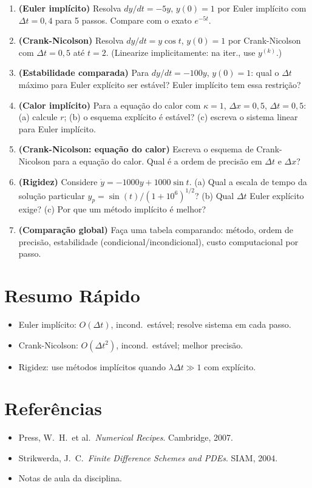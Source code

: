 \documentclass[12pt,a4paper]{article}
\begin{document}
\begin{enumerate}
  \item \textbf{(Euler impl\'icito)} Resolva $dy/dt = -5y$, $y(0)=1$ por Euler impl\'icito com $\Delta t=0{,}4$ para 5 passos. Compare com o exato $e^{-5t}$.
  
  \item \textbf{(Crank-Nicolson)} Resolva $dy/dt = y\cos t$, $y(0)=1$ por Crank-Nicolson com $\Delta t=0{,}5$ at\'e $t=2$. (Linearize implicitamente: na iter., use $y^{(k)}$.)
  
  \item \textbf{(Estabilidade comparada)} Para $dy/dt = -100y$, $y(0)=1$: qual o $\Delta t$ m\'aximo para Euler expl\'icito ser est\'avel? Euler impl\'icito tem essa restri\c{c}\~ao?
  
  \item \textbf{(Calor impl\'icito)} Para a equa\c{c}\~ao do calor com $\kappa=1$, $\Delta x=0{,}5$, $\Delta t=0{,}5$: (a) calcule $r$; (b) o esquema expl\'icito \'e est\'avel? (c) escreva o sistema linear para Euler impl\'icito.
  
  \item \textbf{(Crank-Nicolson: equa\c{c}\~ao do calor)} Escreva o esquema de Crank-Nicolson para a equa\c{c}\~ao do calor. Qual \'e a ordem de precis\~ao em $\Delta t$ e $\Delta x$?
  
  \item \textbf{(Rigidez)} Considere $\dot y = -1000y + 1000\sin t$. (a) Qual a escala de tempo da solu\c{c}\~ao particular $y_p = \sin(t)/(1+10^6)^{1/2}$? (b) Qual $\Delta t$ Euler expl\'icito exige? (c) Por que um m\'etodo impl\'icito \'e melhor?
  
  \item \textbf{(Compara\c{c}\~ao global)} Fa\c{c}a uma tabela comparando: m\'etodo, ordem de precis\~ao, estabilidade (condicional/incondicional), custo computacional por passo.
\end{enumerate}

\section*{Resumo R\'apido}
\begin{itemize}
  \item Euler impl\'icito: $O(\Delta t)$, incond.\ est\'avel; resolve sistema em cada passo.
  \item Crank-Nicolson: $O(\Delta t^2)$, incond.\ est\'avel; melhor precis\~ao.
  \item Rigidez: use m\'etodos impl\'icitos quando $\lambda\Delta t \gg 1$ com expl\'icito.
\end{itemize}

\section*{Refer\^encias}
\begin{itemize}
  \item Press, W.\ H.\ et al.\ \textit{Numerical Recipes}. Cambridge, 2007.
  \item Strikwerda, J.\ C.\ \textit{Finite Difference Schemes and PDEs}. SIAM, 2004.
  \item Notas de aula da disciplina.
\end{itemize}
\end{document}
